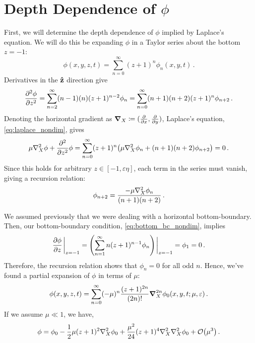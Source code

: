 \documentclass{jfm}
\renewcommand*{\epsilon}{\varepsilon}
\begin{document}
\section{Depth Dependence of \texorpdfstring{$\phi$}{Velocity Potential}}
First, we will determine the depth dependence of $\phi$ implied by
Laplace's equation.
We will do this be expanding $\phi$ in a Taylor series about the bottom
$z=-1$:
\begin{equation}
  \phi(x,y,z,t) = \sum_{n=0}^\infty (z+1)^n\phi_n(x,y,t) \,.
\end{equation}
Derivatives in the $\vu{z}$ direction give
\begin{equation}
  \pdv[2]{\phi}{z} = \sum_{n=2}^{\infty} (n-1)(n)(z+1)^{n-2}\phi_n =
  \sum_{n=0}^{\infty} (n+1)(n+2)(z+1)^n\phi_{n+2} \,.
\end{equation}
Denoting the horizontal gradient as $\grad_X \coloneqq
(\pdv{x},\pdv{y})$,
Laplace's equation, \cref{eq:laplace_nondim}, gives
\begin{equation}
  \mu \laplacian_X{\phi} + \pdv[2]{z} \phi = \sum_{n=0}^\infty
  (z+1)^n\pqty{\mu \laplacian_X \phi_n + (n+1)(n+2)\phi_{n+2}} = 0 \,.
\end{equation}
Since this holds for arbitrary $z \in [-1,\epsilon \eta]$, each
term in the series must vanish, giving a recursion relation:
\begin{equation}
  \phi_{n+2} = \frac{-\mu \laplacian_X{\phi_n}}{(n+1)(n+2)} \,.
\end{equation}

We assumed previously that we were dealing with a horizontal
bottom-boundary.
Then, our bottom-boundary condition, \cref{eq:bottom_bc_nondim}, implies
\begin{equation}
  \pdv{\phi}{z}\eval_{z=-1} = \pqty{\sum_{n=1}^\infty
  n(z+1)^{n-1}\phi_n}\eval_{z=-1} = \phi_1 = 0 \,.
\end{equation}
Therefore, the recursion relation shows that $\phi_n=0$ for all odd $n$.
Hence, we've found a partial expansion of $\phi$ in terms of $\mu$:
\begin{equation}
  \phi(x,y,z,t) = \sum_{n=0}^{\infty} (-\mu)^n \frac{(z+1)^{2n}}{(2n)!}
  \grad_{X}^{2n} \phi_0(x,y,t; \mu, \epsilon) \,.
  \label{eq:phi_expansion}
\end{equation}
If we assume $\mu \ll 1$, we have,
\begin{equation}
  \phi = \phi_0 - \frac{1}{2}\mu (z+1)^2\laplacian_X\phi_0 +
  \frac{\mu^2}{24}(z+1)^4\laplacian_X\laplacian_X\phi_0 +
  \order{\mu^3} \,.
\end{equation}
\end{document}

